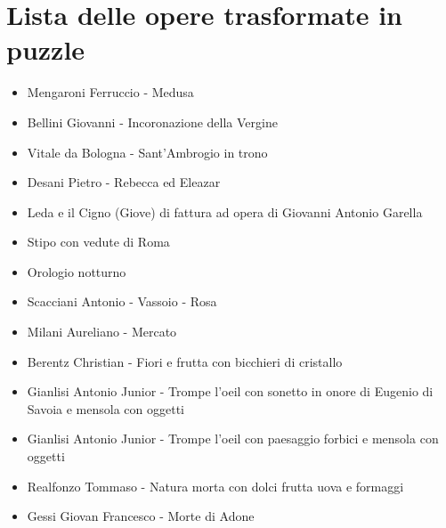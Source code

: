\documentclass[hidelinks,12pt,a4paper]{article}
\begin{document}
	\section{Lista delle opere trasformate in puzzle}
	\begin{itemize}
		\item Mengaroni Ferruccio - Medusa
		\item Bellini Giovanni - Incoronazione della Vergine
		\item Vitale da Bologna - Sant'Ambrogio in trono
		\item Desani Pietro - Rebecca ed Eleazar
		\item Leda e il Cigno (Giove) di fattura ad opera di Giovanni Antonio Garella
		\item Stipo con vedute di Roma
		\item Orologio notturno
		\item Scacciani Antonio - Vassoio - Rosa
		\item Milani Aureliano - Mercato
		\item Berentz Christian - Fiori e frutta con bicchieri di cristallo
		\item Gianlisi Antonio Junior - Trompe l'oeil con sonetto in onore di Eugenio di Savoia e mensola con oggetti
		\item Gianlisi Antonio Junior - Trompe l'oeil con paesaggio forbici e mensola con oggetti
		\item Realfonzo Tommaso - Natura morta con dolci frutta uova e formaggi
		\item Gessi Giovan Francesco - Morte di Adone
	\end{itemize}
\end{document}
